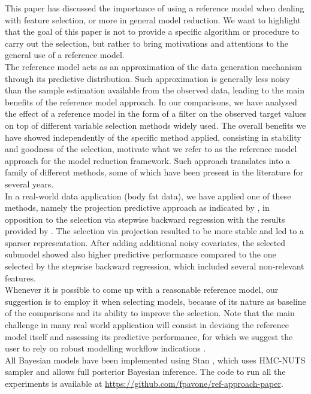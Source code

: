 \documentclass[american,]{article}
\theoremstyle{definition}
\begin{document}
This paper has discussed the importance of using a reference model when dealing with feature selection, or more in general model reduction. We want to highlight that the goal of this paper is not to provide a specific algorithm or procedure to carry out the selection, but rather to bring motivations and attentions to the general use of a reference model. 
\\
The reference model acts as an approximation of the data generation mechanism through its predictive distribution. Such approximation is generally less noisy than the sample estimation available from the observed data, leading to the main benefits of the reference model approach. In our comparisons, we have analysed the effect of a reference model in the form of a filter on the observed target values on top of different variable selection methods widely used. The overall benefits we have showed independently of the specific method applied, consisting in stability and goodness of the selection, motivate what we refer to as the reference model approach for the model reduction framework. Such approach translates into a family of different methods, some of which have been present in the literature for several years.
\\
In a real-world data application (body fat data), we have applied one of these methods, namely the projection predictive approach as indicated by \cite{paper:projpred}, in opposition to the selection via stepwise backward regression with the results provided by \cite{paper:bodyfat}. The selection via projection resulted to be more stable and led to a sparser representation. After adding additional noisy covariates, the selected submodel showed also higher predictive performance compared to the one selected by the stepwise backward regression, which included several non-relevant features.
\\
Whenever it is possible to come up with a reasonable reference model, our suggestion is to employ it when selecting models, because of its nature as baseline of the comparisons and its ability to improve the selection. Note that the main challenge in many real world application will consist in devising the reference model itself and assessing its predictive performance, for which we suggest the user to rely on robust modelling workflow indications \cite[see e.g.][]{gabry2019visualization}.
\\
All Bayesian models have been implemented using Stan \citep{paper:stan}, which uses HMC-NUTS sampler \citep{hoffman2014no} and allows full posterior Bayesian inference. The code to run all the experiments is available at \url{https://github.com/fpavone/ref-approach-paper}. 
\end{document}

